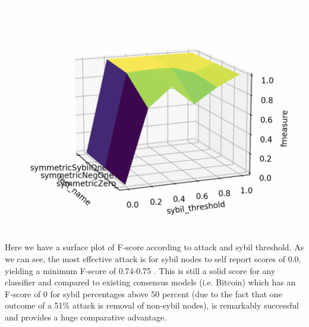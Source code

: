 \documentclass{article}
\begin{document}
\includegraphics[width=\textwidth, height=\textwidth]{f-score-surface-plot}
Here we have a surface plot of F-score according to attack and sybil threshold. As we can see, the most effective attack is for sybil nodes to self report scores of 0.0, yielding a minimum F-score of 0.74-0.75 . This is still a solid score for any classifier and compared to existing consensus models (i.e. Bitcoin) which has an F-score of 0 for sybil percentages above 50 percent (due to the fact that one outcome of a 51\% attack is removal of non-sybil nodes), is remarkably successful and provides a huge comparative advantage.
\end{document}
